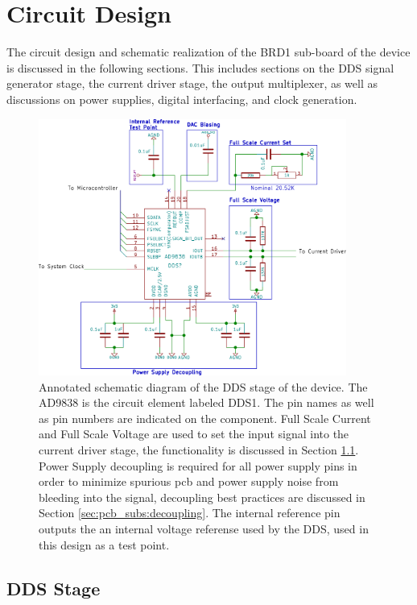 \section{Circuit Design}

The circuit design and schematic realization of the BRD1 sub-board of the device is discussed in the following sections. This includes sections on the DDS signal generator stage, the current driver stage, the output multiplexer, as well as discussions on power supplies, digital interfacing, and clock generation.

\begin{figure}
\centering
\includegraphics[width=0.9\textwidth]{../assets/images/DDS_Stage/DDS_stage_big}
\caption{Annotated schematic diagram of the DDS stage of the device. The AD9838 is the circuit element labeled DDS1. The pin names as well as pin numbers are indicated on the component.  Full Scale Current and Full Scale Voltage are used to set the input signal into the current driver stage, the functionality is discussed in Section \ref{sec:circuit_subs:dds_stage}. Power Supply decoupling is required for all power supply pins in order to minimize spurious pcb and power supply noise from bleeding into the signal, decoupling best practices are discussed in Section \ref{sec:pcb_subs:decoupling}. The internal reference pin outputs the an internal voltage referense used by the DDS, used in this design as a test point. }
\label{fig:dds_stage_main_fig}
\end{figure}


\subsection{DDS Stage}
\label{sec:circuit_subs:dds_stage}


